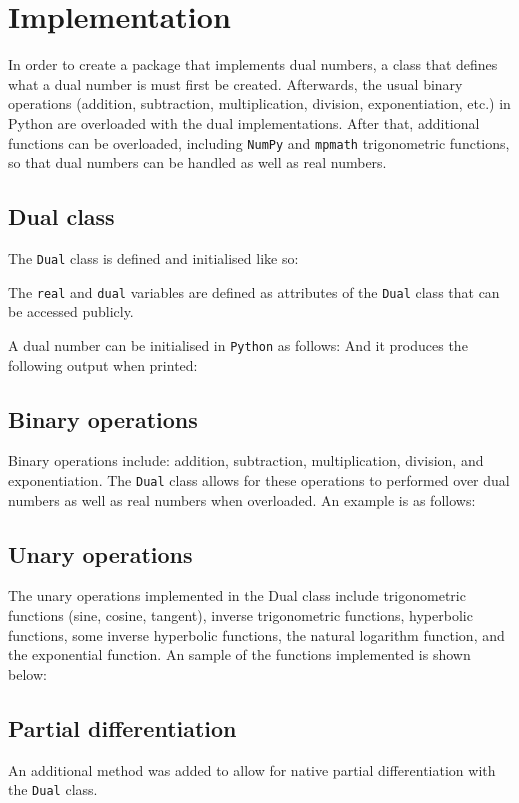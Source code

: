 \documentclass[11pt,a4paper]{article}
\begin{document}
\section{Implementation}
In order to create a package that implements dual numbers, a class that defines what a dual number is must first be created. Afterwards, the usual binary operations (addition, subtraction, multiplication, division, exponentiation, etc.) in Python are overloaded with the dual implementations. After that, additional functions can be overloaded, including \texttt{NumPy} and \texttt{mpmath} trigonometric functions, so that dual numbers can be handled as well as real numbers. 
\subsection{Dual class}
The \texttt{Dual} class is defined and initialised like so:

The \texttt{real} and \texttt{dual} variables are defined as attributes of the \texttt{Dual} class that can be accessed publicly.

A dual number can be initialised in \texttt{Python} as follows:
And it produces the following output when printed:
\newpage
\subsection{Binary operations}
Binary operations include: addition, subtraction, multiplication, division, and exponentiation. The \texttt{Dual} class allows for these operations to performed over dual numbers as well as real numbers when overloaded.
An example is as follows:
\newpage
\subsection{Unary operations}
The unary operations implemented in the Dual class include trigonometric functions (sine, cosine, tangent), inverse trigonometric functions, hyperbolic functions, some inverse hyperbolic functions, the natural logarithm function, and the exponential function.
An sample of the functions implemented is shown below:
\newpage
\subsection{Partial differentiation}
An additional method was added to allow for native partial differentiation with the \texttt{Dual} class. 
\end{document}
